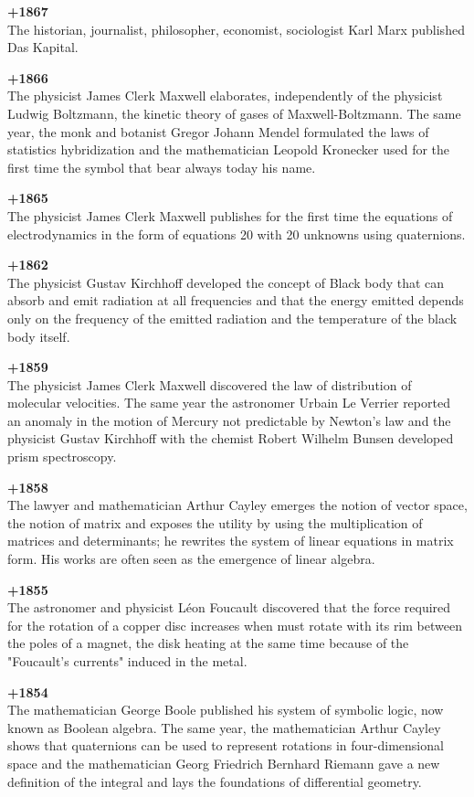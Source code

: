 \textbf{+1867}\\
The historian, journalist, philosopher, economist, sociologist Karl Marx published Das Kapital. 

\textbf{+1866}\\
The physicist James Clerk Maxwell elaborates, independently of the physicist Ludwig Boltzmann, the kinetic theory of gases of Maxwell-Boltzmann. The same year, the monk and botanist Gregor Johann Mendel formulated the laws of statistics hybridization and the mathematician Leopold Kronecker used for the first time the symbol that bear always today his name.

\textbf{+1865}\\
The physicist James Clerk Maxwell publishes for the first time the equations of electrodynamics in the form of equations 20 with 20 unknowns using quaternions. 

\textbf{+1862}\\
The physicist Gustav Kirchhoff developed the concept of Black body that can absorb and emit radiation at all frequencies and that the energy emitted depends only on the frequency of the emitted radiation and the temperature of the black body itself.

\textbf{+1859}\\
The physicist James Clerk Maxwell discovered the law of distribution of molecular velocities. The same year the astronomer Urbain Le Verrier reported an anomaly in the motion of Mercury not predictable by Newton's law and the physicist Gustav Kirchhoff with the chemist Robert Wilhelm Bunsen developed prism spectroscopy. 

\textbf{+1858}\\
The lawyer and mathematician Arthur Cayley emerges the notion of vector space, the notion of matrix and exposes the utility by using the multiplication of matrices and determinants; he rewrites the system of linear equations in matrix form. His works are often seen as the emergence of linear algebra.

\textbf{+1855}\\
The astronomer and physicist Léon Foucault discovered that the force required for the rotation of a copper disc increases when must rotate with its rim between the poles of a magnet, the disk heating at the same time because of the "Foucault's currents" induced in the metal. 

\textbf{+1854}\\
The mathematician George Boole published his system of symbolic logic, now known as Boolean algebra. The same year, the mathematician Arthur Cayley shows that quaternions can be used to represent rotations in four-dimensional space and the mathematician Georg Friedrich Bernhard Riemann gave a new definition of the integral and lays the foundations of differential geometry. 

